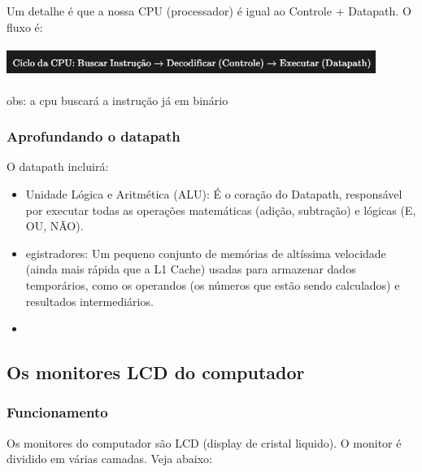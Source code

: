 \documentclass[12pt,a4paper]{report}
\begin{document}
	Um detalhe é que a nossa CPU (processador) é igual ao Controle + Datapath. O fluxo é:
	
	\begin{center}
		
		\includegraphics[width=12cm,height=1cm,keepaspectratio=false]{imagens-teoria/cpu.png}
		
	\end{center}
	
	obs: a cpu buscará a instrução já em binário
	
	\subsubsection{Aprofundando o datapath}
	O datapath incluirá:
	
	\begin{itemize}
		\item Unidade Lógica e Aritmética (ALU): É o coração do Datapath, responsável por executar todas as operações matemáticas (adição, subtração) e lógicas (E, OU, NÃO).
		\item egistradores: Um pequeno conjunto de memórias de altíssima velocidade (ainda mais rápida que a L1 Cache) usadas para armazenar dados temporários, como os operandos (os números que estão sendo calculados) e resultados intermediários.
		\item 
		
	\end{itemize}
	
	\subsection{Os monitores LCD do computador}
	
	\subsubsection{Funcionamento}
	
	Os monitores do computador são LCD (display de cristal liquido). O monitor é dividido em várias camadas. Veja abaixo:
	
\end{document}
